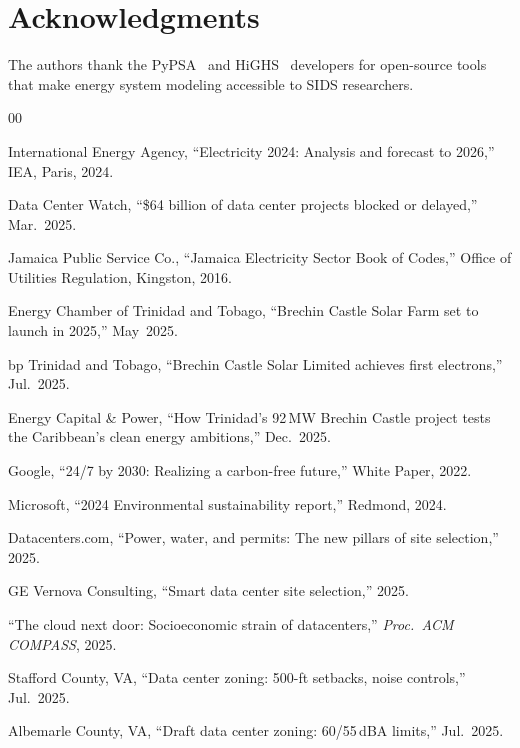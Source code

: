 \documentclass[conference,10pt]{IEEEtran}
\begin{document}
\section*{Acknowledgments}

The authors thank the PyPSA~\cite{pypsa} and HiGHS~\cite{highs} developers for open-source tools that make energy system modeling accessible to SIDS researchers.

\balance

\begin{thebibliography}{00}

 International Energy Agency, ``Electricity 2024: Analysis and forecast to 2026,'' IEA, Paris, 2024.

 Data Center Watch, ``\$64 billion of data center projects blocked or delayed,'' Mar.~2025.

 Jamaica Public Service Co., ``Jamaica Electricity Sector Book of Codes,'' Office of Utilities Regulation, Kingston, 2016.

 Energy Chamber of Trinidad and Tobago, ``Brechin Castle Solar Farm set to launch in 2025,'' May~2025.

 bp Trinidad and Tobago, ``Brechin Castle Solar Limited achieves first electrons,'' Jul.~2025.

 Energy Capital \& Power, ``How Trinidad's 92\,MW Brechin Castle project tests the Caribbean's clean energy ambitions,'' Dec.~2025.

 Google, ``24/7 by 2030: Realizing a carbon-free future,'' White Paper, 2022.

 Microsoft, ``2024 Environmental sustainability report,'' Redmond, 2024.

 Datacenters.com, ``Power, water, and permits: The new pillars of site selection,'' 2025.

 GE Vernova Consulting, ``Smart data center site selection,'' 2025.

 ``The cloud next door: Socioeconomic strain of datacenters,'' \textit{Proc.~ACM COMPASS}, 2025.

 Stafford County, VA, ``Data center zoning: 500-ft setbacks, noise controls,'' Jul.~2025.

 Albemarle County, VA, ``Draft data center zoning: 60/55\,dBA limits,'' Jul.~2025.


\end{thebibliography}
\end{document}
